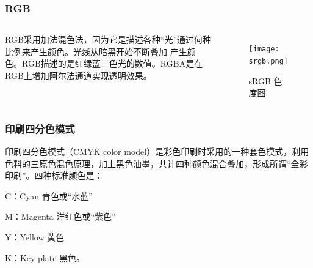 \documentclass[8pt, aspectratio=169]{ctexbeamer}
\begin{document}
\begin{frame}
	\frametitle{RGB}

	\begin{columns}
		RGB采用加法混色法，因为它是描述各种“光”通过何种比例来产生颜色。光线从暗黑开始不断叠加 产生颜色。RGB描述的是红绿蓝三色光的数值。RGBA是在RGB上增加阿尔法通道实现透明效果。

		\begin{figure}
			\texttt{[image: srgb.png]}
			\caption{sRGB 色度图}
		\end{figure}
	\end{columns}



\end{frame}

\begin{frame}
	\frametitle{印刷四分色模式}
	印刷四分色模式（CMYK color model）是彩色印刷时采用的一种套色模式，利用色料的三原色混色原理，加上黑色油墨，共计四种颜色混合叠加，形成所谓“全彩印刷”。四种标准颜色是：

	C：Cyan  青色或“水蓝”

	M：Magenta  洋红色或“紫色”

	Y：Yellow 黄色

	K：Key plate 黑色。

\end{frame}
\end{document}
